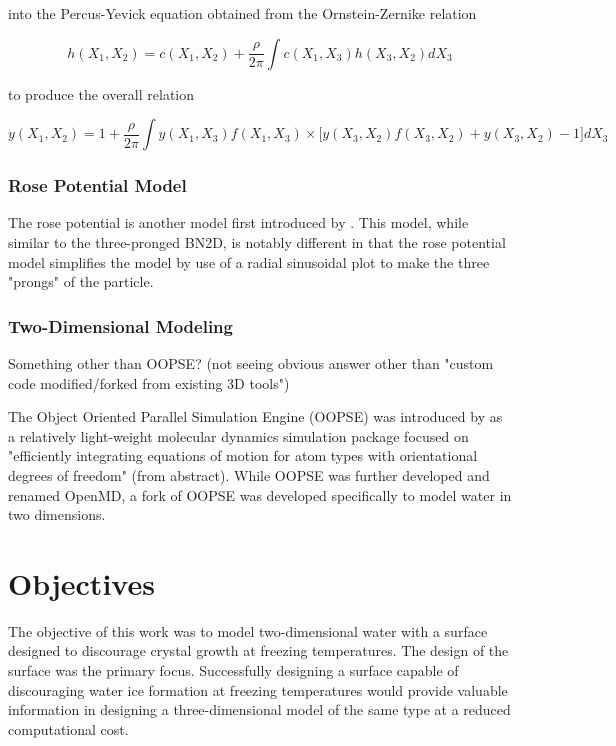 into the Percus-Yevick equation obtained from the Ornstein-Zernike relation 

\begin{equation}
h(X_{1}, X_{2}) = c(X_{1}, X_{2}) + \frac{\rho}{2\pi}\int c(X_{1}, X_{3}) h(X_{3}, X_{2})dX_{3}
\end{equation}

to produce the overall relation

\begin{equation}
y(X_{1}, X_{2}) = 1 + \frac{\rho}{2\pi}\int y(X_{1}, X_{3})f(X_{1}, X_{3}) \times \Big[ y(X_{3}, X_{2})f(X_{3}, X_{2}) + y(X_{3}, X_{2}) - 1 \Big] dX_{3}
\end{equation}


\subsubsection{Rose Potential Model}

The rose potential is another model first introduced by \cite{RoseOG}.
This model, while similar to the three-pronged BN2D, is notably different in that the rose potential model simplifies the model by use of a radial sinusoidal plot to make the three "prongs" of the particle. 

\subsubsection{Two-Dimensional Modeling}

Something other than OOPSE? (not seeing obvious answer other than "custom code modified/forked from existing 3D tools")

The Object Oriented Parallel Simulation Engine (OOPSE) was introduced by \cite{OOPSE} as a relatively light-weight molecular dynamics simulation package focused on "efficiently integrating equations of motion for atom types with orientational degrees of freedom" (from abstract).
While OOPSE was further developed and renamed OpenMD, a fork of OOPSE was developed specifically to model water in two dimensions.

\section{Objectives}

The objective of this work was to model two-dimensional water with a surface designed to discourage crystal growth at freezing temperatures. 
The design of the surface was the primary focus. 
Successfully designing a surface capable of discouraging water ice formation at freezing temperatures would provide valuable information in designing a three-dimensional model of the same type at a reduced computational cost. 

